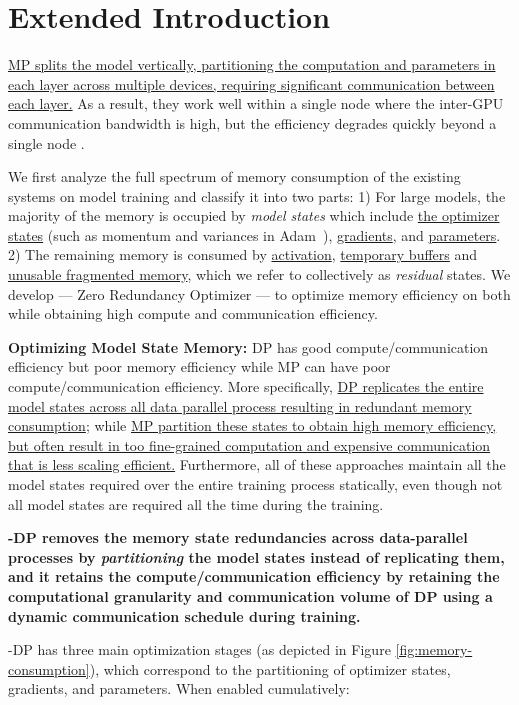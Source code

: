\section{Extended Introduction}
\label{sec:introduction}

\uline{MP splits the model vertically, partitioning the computation and parameters in each layer across multiple devices, requiring significant communication between each layer.} As a result, they work well within a single node where the inter-GPU communication bandwidth is high, but the efficiency degrades quickly beyond a single node \cite{megatronlm}.    

We first analyze the full spectrum of memory consumption of the existing systems on model training and classify it into two parts:  1) For large models, the majority of the memory is occupied by \emph{model states} which include \uline{the optimizer states} (such as momentum and variances in Adam~\cite{DBLP:journals/corr/Adam}), \uline{gradients}, and \uline{parameters}. 
2) The remaining memory is consumed by \uline{activation}, \uline{temporary buffers} and \uline{unusable fragmented memory}, which we refer to collectively as \emph{residual} states.
We develop \name --- Zero Redundancy Optimizer  --- to optimize memory efficiency on both while obtaining high compute and communication efficiency.

{\bf Optimizing Model State Memory:}
DP has good compute/communication efficiency but poor memory efficiency while MP can have poor compute/communication efficiency.
More specifically, \uline{DP replicates the entire model states across all data parallel process resulting in redundant memory consumption};
while \uline{MP partition these states to obtain high memory efficiency, but often result in too fine-grained computation and expensive communication that is less scaling efficient.}
Furthermore, all of these approaches maintain all the model states required over the entire
training process statically, even though not all model states are required all the time during
the training.

\textbf{\name-DP removes the memory state redundancies across data-parallel processes by \emph{partitioning} the model states instead of replicating them, and it retains the compute/communication efficiency by retaining the computational granularity and communication volume of DP using a dynamic communication schedule during training.}

\name-DP has three main optimization stages (as depicted in Figure \ref{fig:memory-consumption}), which correspond to the partitioning of optimizer states, gradients, and parameters. When enabled cumulatively:

